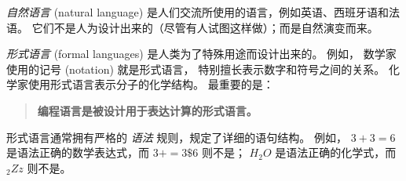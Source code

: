 
{\em 自然语言} (natural language) 是人们交流所使用的语言，例如英语、西班牙语和法语。 它们不是人为设计出来的（尽管有人试图这样做）；而是自然演变而来。


{\em 形式语言} (formal languages) 是人类为了特殊用途而设计出来的。  例如， 数学家使用的记号 (notation) 就是形式语言， 特别擅长表示数字和符号之间的关系。  化学家使用形式语言表示分子的化学结构。  最重要的是：


\begin{quote}
\textbf{编程语言是被设计用于表达计算的形式语言。 }
\end{quote}


形式语言通常拥有严格的 {\em 语法} 规则，规定了详细的语句结构。 例如， $3 + 3 = 6$ 是语法正确的数学表达式，而 $3 + = 3 \$ 6$ 则不是； $H_2O$ 是语法正确的化学式，而 $_2Zz$ 则不是。




